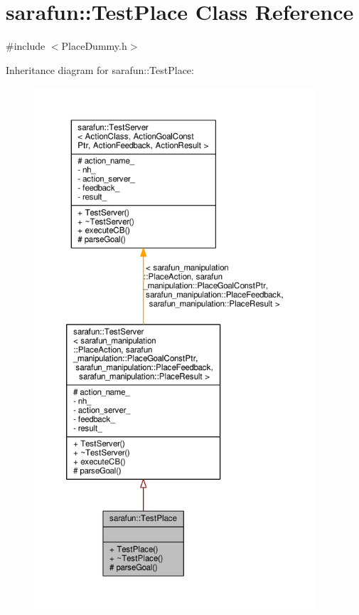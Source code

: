 \hypertarget{classsarafun_1_1TestPlace}{\section{sarafun\-:\-:Test\-Place Class Reference}
\label{classsarafun_1_1TestPlace}
}


{\ttfamily \#include $<$Place\-Dummy.\-h$>$}



Inheritance diagram for sarafun\-:\-:Test\-Place\-:\nopagebreak
\begin{figure}[H]
\begin{center}
\leavevmode
\includegraphics[height=550pt]{d6/d54/classsarafun_1_1TestPlace__inherit__graph}
\end{center}
\end{figure}


